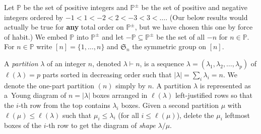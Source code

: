 \documentclass[revision]{FPSAC2024}
\newcommand{\la}{\lambda}
\newcommand{\PP}{\mathbb{P}} %
\begin{document}
Let $\PP$ be the set of positive integers and $\PP^{\pm}$ be the set of positive and negative integers ordered by $-1<1<-2<2<-3<3<\dots$. (Our below results would actually be true for \textbf{any} total order on $\PP^{\pm}$, but we have chosen this one by force of habit.)
We embed $\PP$ into $\PP^{\pm}$ and let $-\PP \subseteq \PP^{\pm}$ be the set of all $-n$ for $n \in \PP$. For $n \in \PP$ write $[n] = \{1,\dots, n\}$ and $\mathfrak{S}_n$ the symmetric group on $[n]$.

A \emph{partition} $\la$ of an integer $n$, denoted $\la \vdash n$, is a sequence $\la=(\la_1,\la_2,\dots,\la_p)$ of $\ell(\la)=p$ parts sorted in decreasing order such that $|\la| = \sum_i{\la_i} = n$. We denote the one-part partition $(n)$ simply by $n$. A partition $\la$ is represented as a~Young diagram of $n=|\la|$ boxes arranged in $\ell(\la)$ left-justified rows so that the $i$-th row from the top contains $\la_i$ boxes. Given a second partition $\mu$ with $\ell(\mu) \leq \ell(\la)$ such that $\mu_i \leq \la_i$ (for all $i \leq \ell(\mu)$), delete the $\mu_i$ leftmost boxes of the $i$-th row to get the diagram of \emph{shape} $\la/\mu$.
\end{document}
